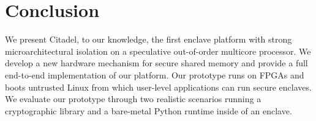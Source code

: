 \section{Conclusion}

We present Citadel, to our knowledge, the first enclave platform with strong microarchitectural isolation on a speculative out-of-order multicore processor. We develop a new hardware mechanism for secure shared memory and provide a full end-to-end implementation of our platform.
Our prototype runs on FPGAs and boots untrusted Linux from which user-level applications can run secure enclaves.
We evaluate our prototype through two realistic scenarios running a cryptographic library and a bare-metal Python runtime inside of an enclave.

